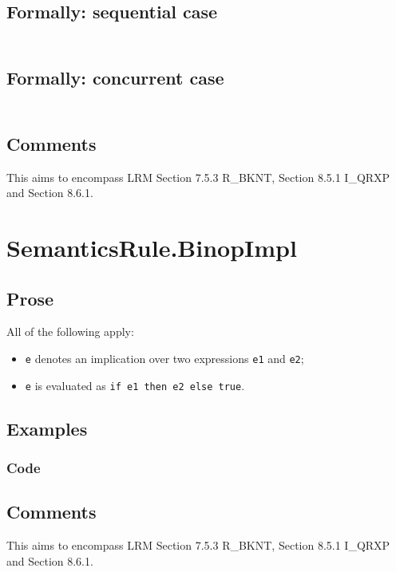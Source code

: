 \documentclass{book}
\begin{document}
  \subsection{Formally: sequential case}
  \begin{align}
  \end{align} 

  \subsection{Formally: concurrent case}
  \begin{align}
  \end{align} 

  \subsection{Comments}
  This aims to encompass LRM Section 7.5.3 R\_BKNT, Section 8.5.1 I\_QRXP and Section
  8.6.1.

\section{SemanticsRule.BinopImpl \label{sec:SemanticsRule.BinopImpl}}

  \subsection{Prose}
  All of the following apply:
  \begin{itemize}
  \item \texttt{e} denotes an implication over two expressions \texttt{e1} and \texttt{e2};
  \item \texttt{e} is evaluated as \texttt{if e1 then e2 else true}.
  \end{itemize}

  \subsection{Examples}

  \subsubsection{Code}

  \subsection{Comments}
  This aims to encompass LRM Section 7.5.3 R\_BKNT, Section 8.5.1 I\_QRXP and Section
  8.6.1.
\end{document}
